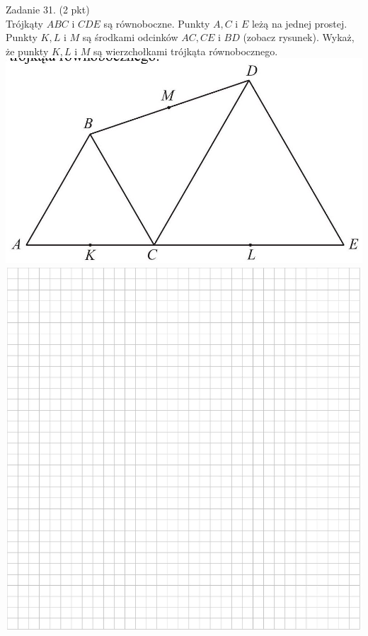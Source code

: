 \documentclass[10pt]{article}
\begin{document}
Zadanie 31. (2 pkt)\\
Trójkąty \(A B C\) i \(C D E\) są równoboczne. Punkty \(A, C\) i \(E\) leżą na jednej prostej. Punkty \(K, L\) i \(M\) są środkami odcinków \(A C, C E\) i \(B D\) (zobacz rysunek). Wykaż, że punkty \(K, L\) i \(M\) są wierzchołkami trójkąta równobocznego.\\
\includegraphics[max width=\textwidth, center]{2024_11_21_ad52a81220b9b2239458g-13}\\
\includegraphics[max width=\textwidth, center]{2024_11_21_ad52a81220b9b2239458g-13(1)}
\end{document}

